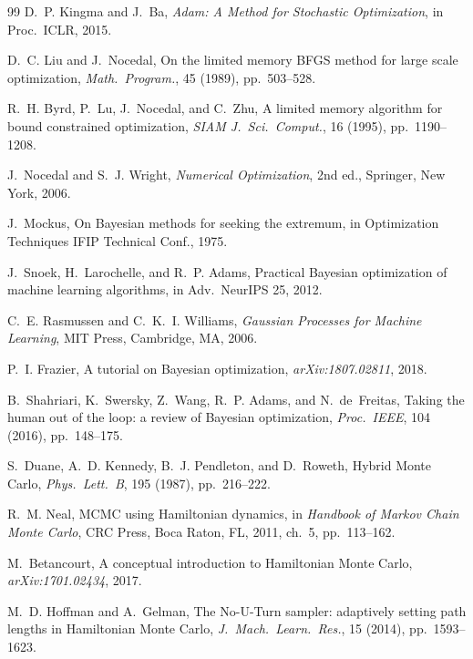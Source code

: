 \documentclass[11pt]{article}
\begin{document}

\begin{thebibliography}{99}
D.~P. Kingma and J.~Ba,
\textit{Adam: A Method for Stochastic Optimization},
in Proc.\ ICLR, 2015.

D.~C. Liu and J.~Nocedal,
On the limited memory BFGS method for large scale optimization,
\textit{Math.\ Program.}, 45 (1989), pp.~503--528.

R.~H. Byrd, P.~Lu, J.~Nocedal, and C.~Zhu,
A limited memory algorithm for bound constrained optimization,
\textit{SIAM J.\ Sci.\ Comput.}, 16 (1995), pp.~1190--1208.

J.~Nocedal and S.~J. Wright,
\textit{Numerical Optimization}, 2nd ed.,
Springer, New York, 2006.

J.~Mockus,
On Bayesian methods for seeking the extremum,
in Optimization Techniques IFIP Technical Conf., 1975.

J.~Snoek, H.~Larochelle, and R.~P. Adams,
Practical Bayesian optimization of machine learning algorithms,
in Adv.\ NeurIPS 25, 2012.

C.~E. Rasmussen and C.~K.~I. Williams,
\textit{Gaussian Processes for Machine Learning},
MIT Press, Cambridge, MA, 2006.

P.~I. Frazier,
A tutorial on Bayesian optimization,
\textit{arXiv:1807.02811}, 2018.

B.~Shahriari, K.~Swersky, Z.~Wang, R.~P. Adams, and N.~de~Freitas,
Taking the human out of the loop: a review of Bayesian optimization,
\textit{Proc.\ IEEE}, 104 (2016), pp.~148--175.

S.~Duane, A.~D. Kennedy, B.~J. Pendleton, and D.~Roweth,
Hybrid Monte Carlo,
\textit{Phys.\ Lett.\ B}, 195 (1987), pp.~216--222.

R.~M. Neal,
MCMC using Hamiltonian dynamics,
in \textit{Handbook of Markov Chain Monte Carlo},
CRC Press, Boca Raton, FL, 2011, ch.~5, pp.~113--162.

M.~Betancourt,
A conceptual introduction to Hamiltonian Monte Carlo,
\textit{arXiv:1701.02434}, 2017.

M.~D. Hoffman and A.~Gelman,
The No-U-Turn sampler: adaptively setting path lengths in Hamiltonian
Monte Carlo,
\textit{J.\ Mach.\ Learn.\ Res.}, 15 (2014), pp.~1593--1623.


\end{thebibliography}
\end{document}
